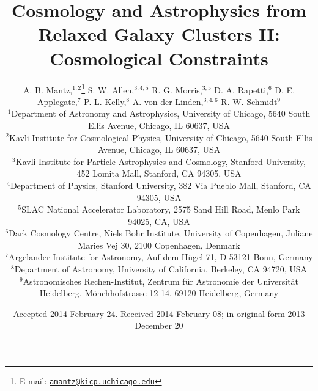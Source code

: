 \documentclass[useAMS,usenatbib,usegraphicx]{mn2e}
\begin{document}
\title[Relaxed Galaxy Clusters: Cosmological Constraints]{Cosmology and Astrophysics from Relaxed Galaxy Clusters II: Cosmological Constraints}

\author[A. B. Mantz et al.]{A. B. Mantz,$^{1,2}$\thanks{E-mail: \href{mailto:amantz@kicp.uchicago.edu}{\tt amantz@kicp.uchicago.edu}} {} 
  S. W. Allen,$^{3,4,5}$
  R. G. Morris,$^{3,5}$
  D. A. Rapetti,$^6$ \newauthor
  D. E. Applegate,$^7$
  P. L. Kelly,$^8$
  A. von der Linden,$^{3,4,6}$
  R. W. Schmidt$^9$\\
  $^1$Department of Astronomy and Astrophysics, University of Chicago, 5640 South Ellis Avenue, Chicago, IL 60637, USA\\
  $^2$Kavli Institute for Cosmological Physics, University of Chicago, 5640 South Ellis Avenue, Chicago, IL 60637, USA\\
  $^3$Kavli Institute for Particle Astrophysics and Cosmology, Stanford University, 452 Lomita Mall, Stanford, CA 94305, USA\\
  $^4$Department of Physics, Stanford University, 382 Via Pueblo Mall, Stanford, CA 94305, USA\\
  $^5$SLAC National Accelerator Laboratory, 2575 Sand Hill Road, Menlo Park 94025, CA, USA\\
  $^6$Dark Cosmology Centre, Niels Bohr Institute, University of Copenhagen, Juliane Maries Vej 30, 2100 Copenhagen, Denmark\\
  $^7$Argelander-Institute for Astronomy, Auf dem H\"ugel 71, D-53121 Bonn, Germany\\
  $^8$Department of Astronomy, University of California, Berkeley, CA 94720, USA\\
  $^9$Astronomisches Rechen-Institut, Zentrum f\"ur Astronomie der Universit\"at Heidelberg, M\"onchhofstrasse 12-14, 69120 Heidelberg, Germany
}
\date{Accepted 2014 February 24. Received 2014 February 08; in original form 2013 December 20}

\pagerange{\pageref{firstpage}--\pageref{lastpage}} 
\maketitle
\label{firstpage}
\end{document}
